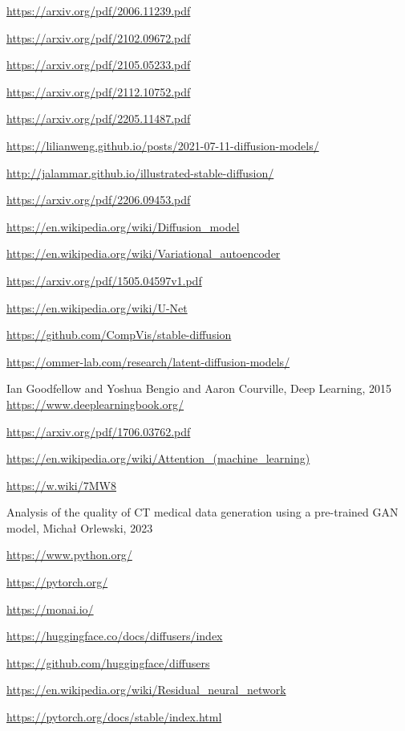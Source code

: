 \documentclass[11pt,a4paper]{report}
\begin{document}
\begin{thebibliography}{99}

\url{https://arxiv.org/pdf/2006.11239.pdf}

\url{https://arxiv.org/pdf/2102.09672.pdf}

\url{https://arxiv.org/pdf/2105.05233.pdf}

\url{https://arxiv.org/pdf/2112.10752.pdf}

\url{https://arxiv.org/pdf/2205.11487.pdf}
  
\url{ https://lilianweng.github.io/posts/2021-07-11-diffusion-models/}

\url{http://jalammar.github.io/illustrated-stable-diffusion/}

\url{https://arxiv.org/pdf/2206.09453.pdf}

\url{https://en.wikipedia.org/wiki/Diffusion_model}

\url{https://en.wikipedia.org/wiki/Variational_autoencoder}

\url{https://arxiv.org/pdf/1505.04597v1.pdf}

\url{https://en.wikipedia.org/wiki/U-Net}

\url{https://github.com/CompVis/stable-diffusion}

\url{https://ommer-lab.com/research/latent-diffusion-models/}

Ian Goodfellow and Yoshua Bengio and Aaron Courville, Deep Learning, 2015
\url{https://www.deeplearningbook.org/}

\url{https://arxiv.org/pdf/1706.03762.pdf}

\url{https://en.wikipedia.org/wiki/Attention_(machine_learning)}

\url{https://w.wiki/7MW8}

Analysis of the quality of CT medical data generation using a pre-trained GAN model, Michał Orlewski, 2023

\url{https://www.python.org/}

\url{https://pytorch.org/}

\url{https://monai.io/}
  
\url{https://huggingface.co/docs/diffusers/index}

\url{https://github.com/huggingface/diffusers}

\url{https://en.wikipedia.org/wiki/Residual_neural_network}

\url{https://pytorch.org/docs/stable/index.html}
  
\end{thebibliography}
\end{document}
